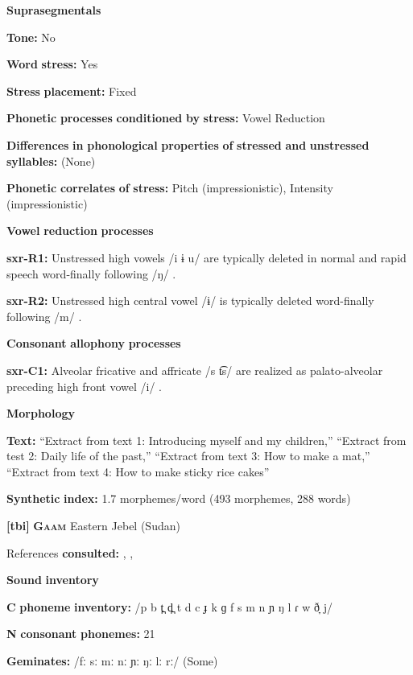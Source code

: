 \textbf{Suprasegmentals}

\textbf{Tone:} No

\textbf{Word} \textbf{stress:} Yes

\textbf{Stress} \textbf{placement:} Fixed

\textbf{Phonetic} \textbf{processes} \textbf{conditioned} \textbf{by} \textbf{stress:} Vowel Reduction

\textbf{Differences} \textbf{in} \textbf{phonological} \textbf{properties} \textbf{of} \textbf{stressed} \textbf{and} \textbf{unstressed} \textbf{syllables:} (None)

\textbf{Phonetic} \textbf{correlates} \textbf{of} \textbf{stress:} Pitch (impressionistic), Intensity (impressionistic)

\textbf{Vowel} \textbf{reduction} \textbf{processes}

\textbf{sxr-R1:} Unstressed high vowels /i ɨ u/ are typically deleted in normal and rapid speech word-finally following /ŋ/ \citep[38]{Pan2012}.

\textbf{sxr-R2:} Unstressed high central vowel /ɨ/ is typically deleted word-finally following /m/ \citep[39]{Pan2012}.

\textbf{Consonant} \textbf{allophony} \textbf{processes}

\textbf{sxr-C1:} Alveolar fricative and affricate /s t͡s/ are realized as palato-alveolar preceding high front vowel /i/ \citep[28]{Pan2012}.

\textbf{Morphology}

\textbf{Text:} “Extract from text 1: Introducing myself and my children,” “Extract from test 2: Daily life of the past,” “Extract from text 3: How to make a mat,” “Extract from text 4: How to make sticky rice cakes” \citep[365-372]{Pan2012}

\textbf{Synthetic} \textbf{index:} 1.7 morphemes/word (493 morphemes, 288 words)

\textbf{[tbi]}   \textbf{\textsc{Gaam}}  Eastern Jebel (Sudan)

References \textbf{consulted:} \citet{Bender1983}, \citet{Crewe1975}, \citet{Stirtz2011}

\textbf{Sound} \textbf{inventory}

\textbf{C} \textbf{phoneme} \textbf{inventory:} /p b t̪ d̪ t d c ɟ k ɡ f s m n ɲ ŋ l ɾ w ð̞ j/

\textbf{N} \textbf{consonant} \textbf{phonemes:} 21

\textbf{Geminates:} /fː sː mː nː ɲː ŋː lː rː/ (Some)

